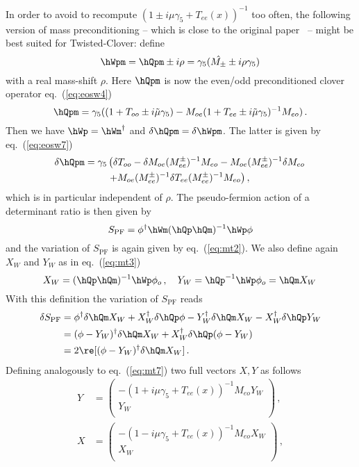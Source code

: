 In order to avoid to recompute $(1\pm i \mu\gamma_5 + T_{ee}(x))^{-1}$
too often, the following version of mass preconditioning -- which is
close to the original paper~\cite{Hasenbusch:2002ai} -- might be best
suited for Twisted-Clover: define
\begin{equation}
  \label{eq:swWhat}
  \hWpm = \hQpm \pm i \rho = \gamma_5(\hat{M_\pm} \pm i \rho\gamma_5)
\end{equation}
with a real mass-shift $\rho$. Here $\hQpm$ is now the even/odd
preconditioned clover operator eq.~(\ref{eq:eosw4})
\[
\hQpm = \gamma_5((1 + T_{oo} \pm i\tilde\mu\gamma_5) -
             M_{oe}( 1 + T_{ee} \pm i\tilde\mu\gamma_5 )^{-1}M_{eo})\,.
\]
Then we have $\hWp = \hWm^\dagger$ and $\delta \hQpm =
\delta\hWpm$. The latter is given by eq.~(\ref{eq:eosw7})
\begin{equation*}
  \begin{split}
    \delta \hQpm = \gamma_5 & \left( \delta T_{oo}-\delta M_{oe}(M_{ee}^\pm )^{-1}M_{eo} -
      M_{oe}(M_{ee}^\pm )^{-1}\delta M_{eo}\right. \\
  &\left. + M_{oe}(M_{ee}^\pm )^{-1} \delta T_{ee} (M_{ee}^\pm )^{-1} M_{eo}\right),
  \end{split}
\end{equation*}
which is in particular independent of $\rho$. 
The pseudo-fermion action of a determinant ratio is then
given by
\[
S_\mathrm{PF} = \phi^\dagger\hWm(\hQp\hQm)^{-1}\hWp\phi
\]
and the variation of $S_\mathrm{PF}$ is again given by
eq.~(\ref{eq:mt2}). We also define again $X_W$ and $Y_W$ as in
eq.~(\ref{eq:mt3})
\begin{equation*}
  X_W = (\hQp\hQm)^{-1}\hWp\phi_o\, ,\quad Y_W = \hQp^{-1}\hWp\phi_o = \hQm
  X_W\, 
\end{equation*}
With this definition the variation of
$S_\mathrm{PF}$ reads
\begin{equation}
  \label{eq:swdeltaS}
  \begin{split}
    \delta S_\mathrm{PF} &= \phi^\dagger\delta\hQm X_W + X_W^\dagger
    \delta \hQp\phi - Y_W^\dagger\delta \hQm X_W - X_W^\dagger\delta\hQp
    Y_W\\
    &= (\phi- Y_W)^\dagger\delta\hQm X_W + X_W^\dagger\delta\hQp(\phi
    - Y_W) \\
    &= 2\re[ (\phi- Y_W)^\dagger\delta\hQm X_W ]\,.
  \end{split}
\end{equation}
Defining analogously to eq.~(\ref{eq:mt7}) two full vectors $X,Y$ as
follows 
\begin{equation}
  \label{eq:swXY}
  \begin{split}
    Y &= 
    \begin{pmatrix}
      -(1+i\mu\gamma_5+T_{ee}(x))^{-1}M_{eo}Y_W \\ Y_W\\
    \end{pmatrix}\, ,\\
    X &= 
    \begin{pmatrix}
      -(1-i\mu\gamma_5+T_{ee}(x))^{-1}M_{eo}X_W \\ X_W\\
    \end{pmatrix}\,,
  \end{split}
\end{equation}
